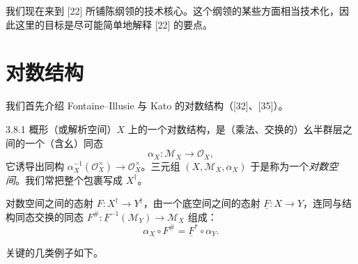 我们现在来到 [22] 所铺陈纲领的技术核心。这个纲领的某些方面相当技术化，因此这里的目标是尽可能简单地解释 [22] 的要点。

\section{对数结构}

我们首先介绍 Fontaine--Illusie 与 Kato 的对数结构（[32]、[35]）。

\begin{definition}{3.8.1}
概形（或解析空间）$X$ 上的一个对数结构，是（乘法、交换的）幺半群层之间的一个（含幺）同态
\[
\alpha_X:\mathcal M_X\to\mathcal O_X,
\]
它诱导出同构 $\alpha_X^{-1}(\mathcal O_X^\times)\to\mathcal O_X^\times$。三元组 $(X,\mathcal M_X,\alpha_X)$ 于是称为一个\emph{对数空间}。我们常把整个包裹写成 $X^\dagger$。
\end{definition}

对数空间之间的态射 $F:X^\dagger\to Y^\dagger$，由一个底空间之间的态射 $\underline F:X\to Y$，连同与结构同态交换的同态 $F^\#:\underline F^{-1}(\mathcal M_Y)\to\mathcal M_X$ 组成：
\[
\alpha_X\circ F^\#=\underline F^*\circ\alpha_Y.
\]

关键的几类例子如下。

